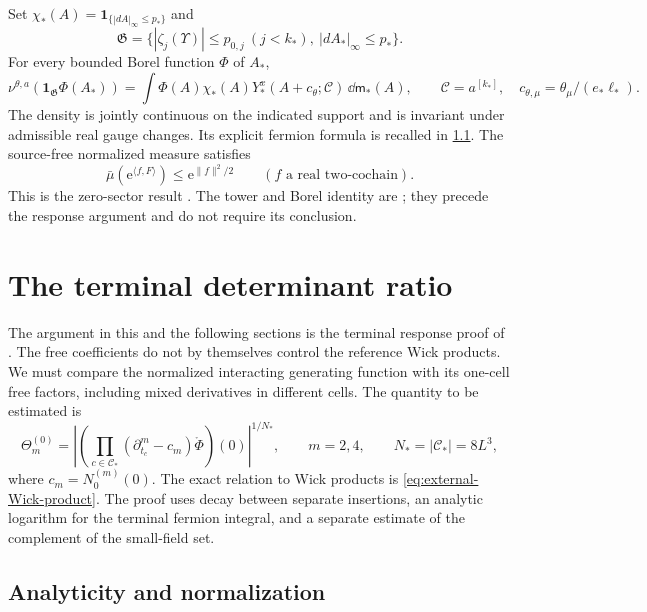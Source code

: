 Set $\chi_*(A)=\mathbf1_{\{|dA|_\infty\le p_*\}}$ and
\[
 \mathfrak G=\{|\zeta_j(\Upsilon)|\le p_{0,j}\ (j<k_*),\
                                  |dA_*|_\infty\le p_*\}.
\]
For every bounded Borel function $\Phi$ of $A_*$,
\begin{equation}\label{eq:rrm-terminal-Borel}
 \nu^{\theta,a}(\mathbf1_{\mathfrak G}\Phi(A_*))
 =\int\Phi(A)\chi_*(A)
             Y_*^x(A+c_\theta;\mathscr C)\,\dd\mathsf m_*(A),
 \qquad \mathscr C=a^{[k_*]},\quad
 c_{\theta,\mu}=\theta_\mu/(e_*\ell_*).
\end{equation}
The density is jointly continuous on the indicated support and is
invariant under admissible real gauge changes. Its explicit fermion
formula is recalled in \cref{subsec:interacting-determinant-ratio}.
The source-free normalized measure satisfies
\begin{equation}\label{eq:rrm-zero-Gaussian}
 \bar\mu(\mathrm e^{\langle f,F\rangle})\le \mathrm e^{\|f\|^2/2}
                 \qquad(f\text{ a real two-cochain}).
\end{equation}
This is the zero-sector result
\cite[Proposition~2.1]{TerminalPressure}.
The tower and Borel identity are
\cite[Proposition~3.1, Theorem~B]{TerminalPressure}; they precede
the response argument and do not require its conclusion.
\section{The terminal determinant ratio}
\label{sec:interacting-response}

The argument in this and the following sections is the terminal
response proof of \cite[\S23]{QED3Master}.
The free coefficients do not by themselves control the
reference Wick products. We must compare the normalized
interacting generating function with its one-cell free
factors, including mixed derivatives in different cells.
The quantity to be estimated is
\begin{equation}\label{eq:interacting-reference-error}
 \Theta_m^{(0)}=
 \left|\left(\prod_{c\in\mathcal C_*}
       (\partial_{t_c}^m-c_m)\mathring\Phi\right)(0)\right|^{1/N_*},
 \qquad m=2,4,\qquad N_*=|\mathcal C_*|=8L^3,
\end{equation}
where $c_m=N_0^{(m)}(0)$. The exact relation to Wick
products is \eqref{eq:external-Wick-product}.
The proof uses decay between separate insertions,
an analytic logarithm for the terminal fermion integral,
and a separate estimate of the complement of the
small-field set.

\subsection{Analyticity and normalization}
\label{subsec:interacting-determinant-ratio}

